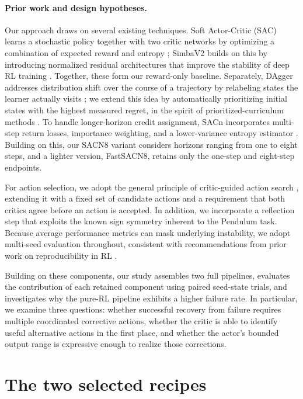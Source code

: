  \paragraph{Prior work and design hypotheses.}
Our approach draws on several existing techniques. Soft Actor-Critic
(SAC) learns a stochastic policy together with two critic networks by
optimizing a combination of expected reward and entropy
\cite{haarnoja2018sac}; SimbaV2 builds on this by introducing
normalized residual architectures that improve the stability of deep
RL training \cite{lee2025simba}. Together, these form our reward-only
baseline. Separately, DAgger addresses distribution shift over the
course of a trajectory by relabeling states the learner actually
visits \cite{ross2011dagger}; we extend this idea by automatically
prioritizing initial states with the highest measured regret, in the
spirit of prioritized-curriculum methods \cite{jiang2021plr}. To handle
longer-horizon credit assignment, SACn incorporates multi-step return
losses, importance weighting, and a lower-variance entropy estimator
\cite{lyskawa2025sacn}. Building on this, our SACN8 variant considers
horizons ranging from one to eight steps, and a lighter version,
FastSACN8, retains only the one-step and eight-step endpoints.

For action selection, we adopt the general principle of critic-guided
action search \cite{kalashnikov2018qtopt}, extending it with a fixed
set of candidate actions and a requirement that both critics agree
before an action is accepted. In addition, we incorporate a reflection
step that exploits the known sign symmetry inherent to the Pendulum
task. Because average performance metrics can mask underlying
instability, we adopt multi-seed evaluation throughout, consistent
with recommendations from prior work on reproducibility in RL
\cite{henderson2018matters,agarwal2021precipice}.

Building on these components, our study assembles two full pipelines,
evaluates the contribution of each retained component using paired
seed-state trials, and investigates why the pure-RL pipeline exhibits
a higher failure rate. In particular, we examine three questions:
whether successful recovery from failure requires multiple coordinated
corrective actions, whether the critic is able to identify useful
alternative actions in the first place, and whether the actor's
bounded output range is expressive enough to realize those corrections.

\clearpage
\onecolumn
\small
\section{The two selected recipes}
\vspace{2mm}

